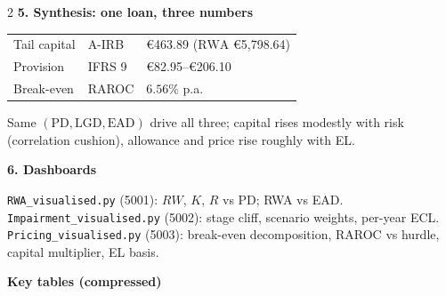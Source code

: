 \documentclass[10pt,a4paper]{report}
\renewcommand{\EUR}[1]{\euro#1}
\newcommand{\PD}{\mathrm{PD}}
\newcommand{\LGD}{\mathrm{LGD}}
\newcommand{\EAD}{\mathrm{EAD}}
\newcommand{\RWA}{\mathrm{RWA}}
\newcommand{\sect}[1]{\vspace{1.2mm}\textcolor{ceruleanlink}{\textbf{#1}}\par\vspace{0.3mm}}
\begin{document}
\begin{multicols}{2}
\sect{5. Synthesis: one loan, three numbers}

\begin{center}\small
\begin{tabular}{@{}lll@{}}
\toprule
Tail capital & A-IRB & \EUR{463.89} ($\RWA$ \EUR{5{,}798.64})\\
Provision & IFRS 9 & \EUR{82.95}--\EUR{206.10}\\
Break-even & RAROC & $6.56\%$ p.a.\\
\bottomrule
\end{tabular}
\end{center}
Same $(\PD,\LGD,\EAD)$ drive all three; capital rises modestly with
risk (correlation cushion), allowance and price rise roughly with EL.

\sect{6. Dashboards}

\texttt{RWA\_visualised.py} (5001): $RW$, $K$, $R$ vs PD; RWA vs EAD.\\
\texttt{Impairment\_visualised.py} (5002): stage cliff, scenario
weights, per-year ECL.\\
\texttt{Pricing\_visualised.py} (5003): break-even decomposition,
RAROC vs hurdle, capital multiplier, EL basis.

\sect{Key tables (compressed)}


\end{multicols}
\end{document}
